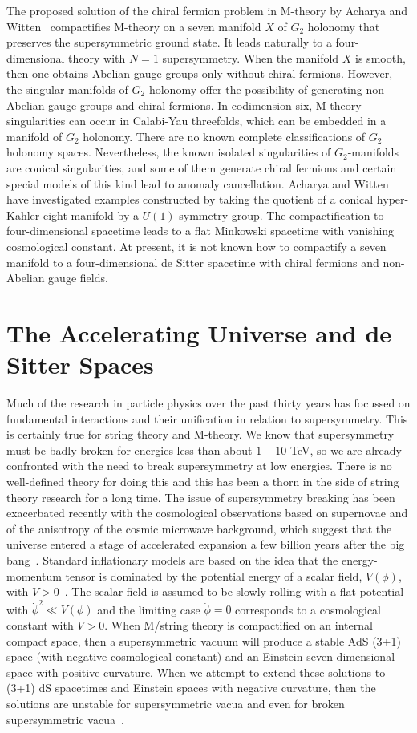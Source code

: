 \documentclass[a4paper,12pt]{article}
\begin{document}
The proposed solution of the chiral fermion problem in M-theory by Acharya and
Witten~\cite{Acharya} compactifies M-theory on a seven manifold $X$ of $G_2$
holonomy that preserves the supersymmetric ground state. It leads naturally to
a four-dimensional theory with $N=1$ supersymmetry. When the manifold $X$ is smooth,
then one obtains Abelian gauge groups only without chiral fermions. However, the
singular manifolds of $G_2$ holonomy offer the possibility of generating non-Abelian
gauge groups and chiral fermions. In codimension six, M-theory singularities can
occur in Calabi-Yau threefolds, which can be embedded in a manifold of $G_2$
holonomy. There are no known complete classifications of $G_2$ holonomy spaces.
Nevertheless, the known isolated singularities of $G_2$-manifolds are conical
singularities, and some of them generate chiral fermions and certain special models
of this kind lead to anomaly cancellation. Acharya and Witten~\cite{Acharya} have
investigated examples constructed by taking the quotient of a conical hyper-Kahler
eight-manifold by a $U(1)$ symmetry group. The compactification to four-dimensional
spacetime leads to a flat Minkowski spacetime with vanishing cosmological constant.
At present, it is not known how to compactify a seven manifold to a four-dimensional
de Sitter spacetime with chiral fermions and non-Abelian gauge fields.


\section{\bf The Accelerating Universe and de Sitter Spaces}

Much of the research in particle physics over the past thirty years has
focussed on fundamental interactions and their unification in relation to
supersymmetry. This is certainly true for string theory and M-theory. We
know that supersymmetry must be badly broken for energies less than about
$1-10$ TeV, so we are already confronted with the need to break
supersymmetry at low energies. There is no well-defined theory for doing
this and this has been a thorn in the side of string theory research for a
long time. The issue of supersymmetry breaking has been exacerbated
recently with the cosmological observations based on supernovae and of the
anisotropy of the cosmic microwave background, which suggest that the
universe entered a stage of accelerated expansion a few billion years after
the big bang~\cite{Perlmutter,Netterfield}. Standard inflationary models are based on
the idea that the energy-momentum tensor is dominated by the potential energy of a
scalar field, $V(\phi)$, with $V > 0$~\cite{Linde}. The scalar field is assumed to
be slowly rolling with a flat potential with $\dot{\phi}^2 \ll V(\phi)$ and the
limiting case ${\dot\phi}=0$ corresponds to a cosmological constant with $V > 0$.
When M/string theory is compactified on an internal compact space, then a
supersymmetric vacuum will produce a stable AdS (3+1) space (with negative
cosmological constant) and an Einstein seven-dimensional space with positive
curvature. When we attempt to extend these solutions to (3+1) dS spacetimes and
Einstein spaces with negative curvature, then the solutions are unstable for
supersymmetric vacua and even for broken supersymmetric
vacua~\cite{Gibbons,Maldacena}.
\end{document}
